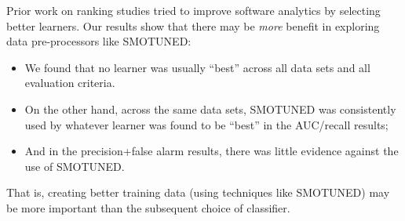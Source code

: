 \documentclass[10pt,conference]{IEEEtran}
\newcommand{\bi}{\begin{itemize}[leftmargin=0.4cm]}
\newcommand{\ei}{\end{itemize}}
\theoremstyle{break}
\theoremstyle{break}
\begin{document}








Prior work on ranking studies tried to improve software analytics by selecting better learners.
Our results show that there may be {\em more} benefit in exploring data pre-processors like SMOTUNED:
\bi
\item
We found  that no  learner  was  usually  
``best''  
across all  data  sets  and  all  evaluation  criteria. 
\item 
On the other hand, across the same data sets,
SMOTUNED was  consistently  used  by  whatever  learner  was  found  to  be ``best'' in the  AUC/recall results;
\item
And in the precision+false alarm results, there was little evidence against the use of SMOTUNED.
\ei
That is, creating better training data  (using techniques like SMOTUNED) may be  more important than  the  subsequent  choice  of  classifier.
\end{document}
